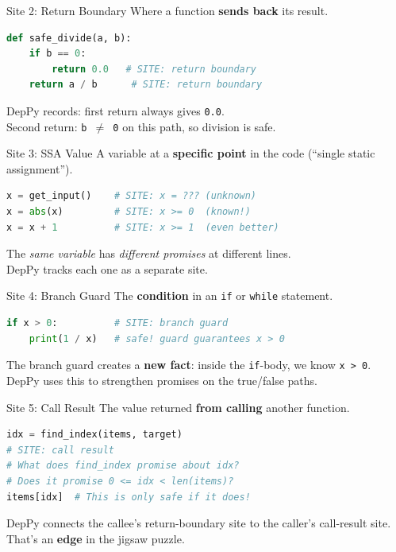 \documentclass[aspectratio=169,10pt]{beamer}
\begin{document}
\begin{frame}[fragile]{Site 2: Return Boundary}
Where a function \textbf{sends back} its result.
\vspace{0.3em}
\begin{lstlisting}[language=Python]
def safe_divide(a, b):
    if b == 0:
        return 0.0   # SITE: return boundary
    return a / b      # SITE: return boundary
\end{lstlisting}
\vspace{0.3em}
DepPy records: first return always gives \texttt{0.0}.\\
Second return: \texttt{b $\neq$ 0} on this path, so division is safe.
\end{frame}

\begin{frame}[fragile]{Site 3: SSA Value}
A variable at a \textbf{specific point} in the code (``single static assignment'').
\vspace{0.3em}
\begin{lstlisting}[language=Python]
x = get_input()    # SITE: x = ??? (unknown)
x = abs(x)         # SITE: x >= 0  (known!)
x = x + 1          # SITE: x >= 1  (even better)
\end{lstlisting}
\vspace{0.3em}
The \emph{same variable} has \emph{different promises} at different lines.\\
DepPy tracks each one as a separate site.
\end{frame}

\begin{frame}[fragile]{Site 4: Branch Guard}
The \textbf{condition} in an \texttt{if} or \texttt{while} statement.
\vspace{0.3em}
\begin{lstlisting}[language=Python]
if x > 0:          # SITE: branch guard
    print(1 / x)   # safe! guard guarantees x > 0
\end{lstlisting}
\vspace{0.3em}
The branch guard creates a \textbf{new fact}: inside the \texttt{if}-body, we know \texttt{x > 0}.\\
DepPy uses this to strengthen promises on the true/false paths.
\end{frame}

\begin{frame}[fragile]{Site 5: Call Result}
The value returned \textbf{from calling} another function.
\vspace{0.3em}
\begin{lstlisting}[language=Python]
idx = find_index(items, target)
# SITE: call result
# What does find_index promise about idx?
# Does it promise 0 <= idx < len(items)?
items[idx]  # This is only safe if it does!
\end{lstlisting}
\vspace{0.3em}
DepPy connects the callee's return-boundary site to the caller's call-result site.
That's an \textbf{edge} in the jigsaw puzzle.
\end{frame}
\end{document}
